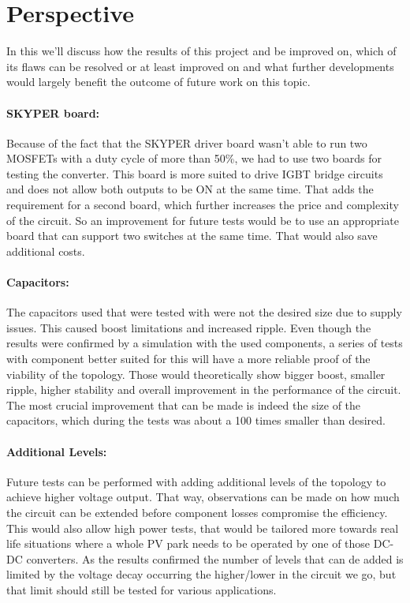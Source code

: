 \chapter{Perspective}\label{ch:perspective}

In this we'll discuss how the results of this project and be improved on, 
which of its flaws can be resolved or at least improved on and what further developments would largely benefit the outcome of future work on this topic. 

\subsubsection{SKYPER board:}
Because of the fact that the SKYPER driver board wasn't able to run two MOSFETs with a duty cycle of more than 50\%, we had to use two boards for testing the converter. This board is more suited to drive IGBT bridge circuits and does not allow both outputs to be ON at the same time. That adds the requirement for a second board, which further increases the price and complexity of the circuit.
So an improvement for future tests would be to use an appropriate board that can support two switches at the same time. That would also save additional costs.

\subsubsection{Capacitors:}
The capacitors used that were tested with were not the desired size due to supply issues.
This caused boost limitations and increased ripple.
Even though the results were confirmed by a simulation with the used components, a series of tests with component better suited for this will have a more reliable proof of the viability of the topology.
Those would theoretically show bigger boost, smaller ripple, higher stability and overall improvement in the performance of the circuit.
The most crucial improvement that can be made is indeed the size of the capacitors, which during the tests was about a 100 times smaller than desired.
\clearpage

\subsubsection{Additional Levels:}
Future tests can be performed with adding additional levels of the topology to achieve higher voltage output.
That way, observations can be made on how much the circuit can be extended before component losses compromise the efficiency.
This would also allow high power tests, that would be tailored more towards real life situations where a whole PV park needs to be operated by one of those DC-DC converters.
As the results confirmed the number of levels that can de added is limited by the voltage decay occurring the higher/lower in the circuit we go,
but that limit should still be tested for various applications. 

